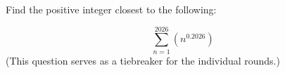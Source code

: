 Find the positive integer closest to the following:

$$\sum^{2026}_{n=1}\left(n^{0.2026}\right)$$(This question serves as a tiebreaker for the individual rounds.)
